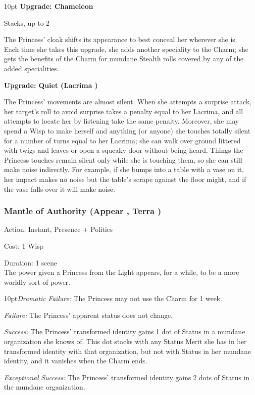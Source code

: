 \begin{myindentpar}{10pt} \textbf{Upgrade: Chameleon}

Stacks, up to 2

The Princess' cloak shifts its appearance to best conceal her wherever she is. Each time she takes this upgrade, she adds another speciality to the Charm; she gets the benefits of the Charm for mundane Stealth rolls covered by any of the added specialities.

\textbf{Upgrade: Quiet (Lacrima \textbullet\textbullet)}

The Princess' movements are almost silent. When she attempts a surprise attack, her target's roll to avoid surprise takes a penalty equal to her Lacrima, and all attempts to locate her by listening take the same penalty. Moreover, she may spend a Wisp to make herself and anything (or anyone) she touches totally silent for a number of turns equal to her Lacrima; she can walk over ground littered with twigs and leaves or open a squeaky door without being heard. Things the Princess touches remain silent only while she is touching them, so she can still make noise indirectly. For example, if she bumps into a table with a vase on it, her impact makes no noise but the table's scrape against the floor might, and if the vase falls over it will make noise.

\end{myindentpar}

\subsubsection*{Mantle of Authority (Appear \textbullet, Terra \textbullet)}
\noindent Action: Instant, Presence + Politics 

\noindent Cost: 1 Wisp

\noindent Duration: 1 scene \\

\noindent The power given a Princess from the Light appears, for a while, to be a more worldly sort of power.

    \begin{myindentpar}{10pt}\emph{Dramatic Failure:} The Princess may not use the Charm for 1 week.

    \emph{Failure:} The Princess' apparent status does not change.

    \emph{Success:} The Princess' transformed identity gains 1 dot of Status in a mundane organization she knows of. This dot stacks with any Status Merit she has in her transformed identity with that organization, but not with Status in her mundane identity, and it vanishes when the Charm ends.

    \emph{Exceptional Success:} The Princess' transformed identity gains 2 dots of Status in the mundane organization.\end{myindentpar}

